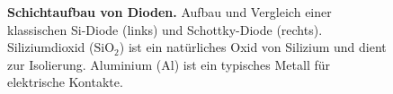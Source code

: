{%

\begin{figure}[H]
    \begin{minipage}[c]{0.5\textwidth}
    \centering
    
    \end{minipage}
    \begin{minipage}[c]{0.5\textwidth}
    \centering
      
    \end{minipage}

    \label{fig:SchichtaufbauVonDioden}
    \caption{\textbf{Schichtaufbau von Dioden.} Aufbau und Vergleich einer klassischen Si-Diode (links) 
    und Schottky-Diode (rechts). Siliziumdioxid ($\mathrm{SiO_2}$) ist ein natürliches Oxid von Silizium und dient zur Isolierung. Aluminium (Al) ist ein typisches Metall für elektrische Kontakte.} 
\end{figure}
}
